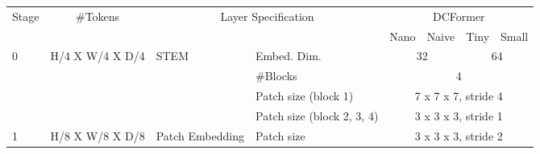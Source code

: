 \begin{table*}[t]
\scriptsize
\renewcommand\arraystretch{1.4}
\begin{center}
\begin{tabular}{|llll|cccc|}
\hline
\multicolumn{1}{|c|}{\multirow{2}{*}{Stage}} & \multicolumn{1}{c|}{\multirow{2}{*}{\#Tokens}}            & \multicolumn{2}{c|}{\multirow{2}{*}{Layer Specification}}                             & \multicolumn{4}{c|}{DCFormer}                                                            \\ \cline{5-8} 
\multicolumn{1}{|c|}{}                       & \multicolumn{1}{c|}{}                                    & \multicolumn{2}{l|}{}                                                                 & \multicolumn{1}{c|}{Nano}     & \multicolumn{1}{c|}{Naive}     & \multicolumn{1}{c|}{Tiny}     & Small     \\ \hline
\multicolumn{1}{|l|}{\multirow{4}{*}{0}}     & \multicolumn{1}{l|}{\multirow{4}{*}{H/4 X W/4 X D/4}}    & \multicolumn{1}{l|}{\multirow{4}{*}{STEM}}               & Embed. Dim.                & \multicolumn{2}{c|}{32}       & \multicolumn{2}{c|}{64}              \\ \cline{4-8} 
\multicolumn{1}{|l|}{}                       & \multicolumn{1}{l|}{}                                    & \multicolumn{1}{l|}{}                                    & \#Blocks                    & \multicolumn{4}{c|}{4}                                                                       \\ \cline{4-8} 
\multicolumn{1}{|l|}{}                       & \multicolumn{1}{l|}{}                                    & \multicolumn{1}{l|}{}                                    & Patch size (block 1)       & \multicolumn{4}{c|}{7 x 7 x 7, stride 4}                                                     \\ \cline{4-8} 
\multicolumn{1}{|l|}{}                       & \multicolumn{1}{l|}{}                                    & \multicolumn{1}{l|}{}                                    & Patch size (block 2, 3, 4) & \multicolumn{4}{c|}{3 x 3 x 3, stride 1}                                                     \\ \hline
\multicolumn{1}{|l|}{\multirow{5}{*}{1}}     & \multicolumn{1}{l|}{\multirow{5}{*}{H/8 X W/8 X D/8}}    & \multicolumn{1}{l|}{\multirow{2}{*}{Patch Embedding}}    & Patch size                 & \multicolumn{4}{c|}{3 x 3 x 3, stride 2}                                                     \\ \cline{4-8} 

\end{tabular}
\end{center}
\end{table*}

